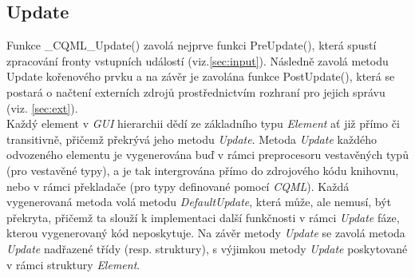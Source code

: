 \documentclass[11pt,twoside,a4paper]{book}
\begin{document}
{{\begin{ttemize}
{{\begin{lastlisting}[frame=single,caption=Řešení v pseudokódu problematického použití operátoru "." v přiřazovacím výroku,label=lst:var0N]
\subsection{Update}
Funkce \_CQML\_Update() zavolá nejprve funkci PreUpdate(), která spustí zpracování fronty vstupních událostí (viz.\ref{sec:input}). Následně zavolá metodu Update kořenového prvku a na závěr je zavolána funkce PostUpdate(), která se postará o načtení externích zdrojů prostřednictvím rozhraní pro jejich správu (viz. \ref{sec:ext}).\\
Každý element v \textit{GUI} hierarchii dědí ze základního typu \textit{Element} ať již přímo či transitivně, přičemž překrývá jeho metodu \textit{Update}. Metoda \textit{Update} každého odvozeného elementu je vygenerována buď v rámci preprocesoru vestavěných typů (pro vestavěné typy), a je tak intergrována přímo do zdrojového kódu knihovnu, nebo v rámci překladače (pro typy definované pomocí \textit{CQML}). Každá vygenerovaná metoda volá metodu \textit{DefaultUpdate}, která může, ale nemusí, být překryta, přičemž ta slouží k implementaci další funkčnosti v rámci \textit{Update} fáze, kterou vygenerovaný kód neposkytuje. Na závěr metody \textit{Update} se zavolá metoda \textit{Update} nadřazené třídy (resp. struktury), s výjimkou metody \textit{Update} poskytované v rámci struktury \textit{Element}.\\


\end{lastlisting}}}
\end{ttemize}}}
\end{document}
